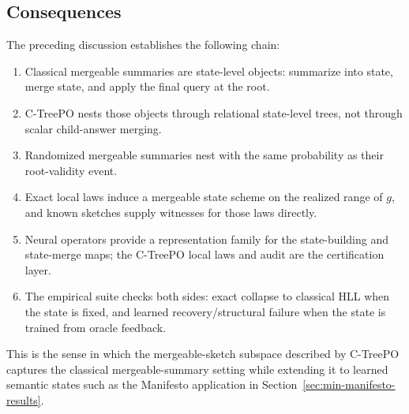\subsection{Consequences}
\label{app:v6-what-established}

The preceding discussion establishes the following chain:
\begin{enumerate}[leftmargin=1.5em]
\item Classical mergeable summaries are state-level objects: summarize into
state, merge state, and apply the final query at the root.
\item C-TreePO nests those objects through relational state-level trees, not
through scalar child-answer merging.
\item Randomized mergeable summaries nest with the same probability as their
root-validity event.
\item Exact local laws induce a mergeable state scheme on the realized range
of \(g\), and known sketches supply witnesses for those laws directly.
\item Neural operators provide a representation family for the state-building
and state-merge maps; the C-TreePO local laws and audit are the
certification layer.
\item The empirical suite checks both sides: exact collapse to classical HLL
when the state is fixed, and learned recovery/structural failure when the
state is trained from oracle feedback.
\end{enumerate}

This is the sense in which the mergeable-sketch subspace described by
C-TreePO captures the classical mergeable-summary setting while extending it to
learned semantic states such as the Manifesto application in
Section~\ref{sec:min-manifesto-results}.

